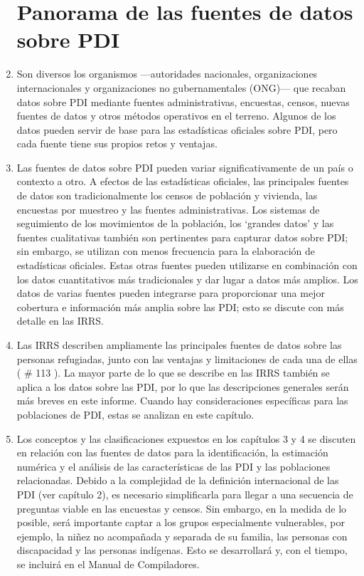 \documentclass[
]{book}
\begin{document}
\begin{enumerate}
{  \section{Panorama de las fuentes de datos sobre PDI}\label{panorama-de-las-fuentes-de-datos-sobre-pdi}}
\item
  Son diversos los organismos ---autoridades nacionales, organizaciones internacionales y organizaciones no gubernamentales (ONG)--- que recaban datos sobre PDI mediante fuentes administrativas, encuestas, censos, nuevas fuentes de datos y otros métodos operativos en el terreno. Algunos de los datos pueden servir de base para las estadísticas oficiales sobre PDI, pero cada fuente tiene sus propios retos y ventajas.
\item
  Las fuentes de datos sobre PDI pueden variar significativamente de un país o contexto a otro. A efectos de las estadísticas oficiales, las principales fuentes de datos son tradicionalmente los censos de población y vivienda, las encuestas por muestreo y las fuentes administrativas. Los sistemas de seguimiento de los movimientos de la población, los `grandes datos' y las fuentes cualitativas también son pertinentes para capturar datos sobre PDI; sin embargo, se utilizan con menos frecuencia para la elaboración de estadísticas oficiales. Estas otras fuentes pueden utilizarse en combinación con los datos cuantitativos más tradicionales y dar lugar a datos más amplios. Los datos de varias fuentes pueden integrarse para proporcionar una mejor cobertura e información más amplia sobre las PDI; esto se discute con más detalle en las IRRS.
\item
  Las IRRS describen ampliamente las principales fuentes de datos sobre las personas refugiadas, junto con las ventajas y limitaciones de cada una de ellas (
  \# 113
  ). La mayor parte de lo que se describe en las IRRS también se aplica a los datos sobre las PDI, por lo que las descripciones generales serán más breves en este informe. Cuando hay consideraciones específicas para las poblaciones de PDI, estas se analizan en este capítulo.
\item
  Los conceptos y las clasificaciones expuestos en los capítulos 3 y 4 se discuten en relación con las fuentes de datos para la identificación, la estimación numérica y el análisis de las características de las PDI y las poblaciones relacionadas. Debido a la complejidad de la definición internacional de las PDI (ver capítulo 2), es necesario simplificarla para llegar a una secuencia de preguntas viable en las encuestas y censos. Sin embargo, en la medida de lo posible, será importante captar a los grupos especialmente vulnerables, por ejemplo, la niñez no acompañada y separada de su familia, las personas con discapacidad y las personas indígenas. Esto se desarrollará y, con el tiempo, se incluirá en el Manual de Compiladores.

\end{enumerate}
\end{document}
